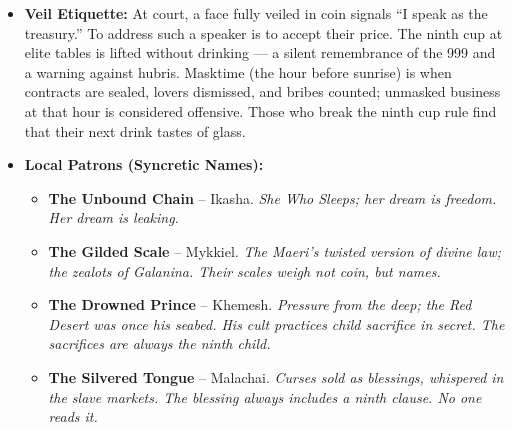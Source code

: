 \begin{itemize}
\item \textbf{Veil Etiquette:} At court, a face fully veiled in coin signals ``I speak as the treasury.'' To address such a speaker is to accept their price. The ninth cup at elite tables is lifted without drinking --- a silent remembrance of the 999 and a warning against hubris. Masktime (the hour before sunrise) is when contracts are sealed, lovers dismissed, and bribes counted; unmasked business at that hour is considered offensive. Those who break the ninth cup rule find that their next drink tastes of glass.

\item \textbf{Local Patrons (Syncretic Names):}
  \begin{itemize}
    \item \textbf{The Unbound Chain} -- Ikasha. \textit{She Who Sleeps; her dream is freedom. Her dream is leaking.}
    \item \textbf{The Gilded Scale} -- Mykkiel. \textit{The Maeri's twisted version of divine law; the zealots of Galanina. Their scales weigh not coin, but names.}
    \item \textbf{The Drowned Prince} -- Khemesh. \textit{Pressure from the deep; the Red Desert was once his seabed. His cult practices child sacrifice in secret. The sacrifices are always the ninth child.}
    \item \textbf{The Silvered Tongue} -- Malachai. \textit{Curses sold as blessings, whispered in the slave markets. The blessing always includes a ninth clause. No one reads it.}
  \end{itemize}
\end{itemize}

